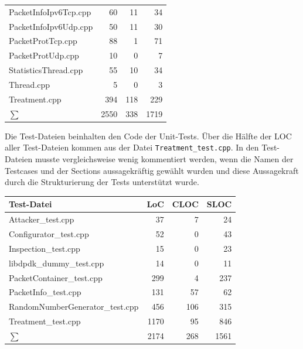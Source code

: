 \documentclass[../review_3.tex]{subfiles}
\begin{document}
\begin{longtable}[H]{p{10cm}rrr}
    PacketInfoIpv6Tcp.cpp    & 60           & 11            & 34            \\
    PacketInfoIpv6Udp.cpp    & 50           & 11            & 30            \\
    PacketProtTcp.cpp        & 88           & 1             & 71            \\
    PacketProtUdp.cpp        & 10           & 0             & 7             \\
    StatisticsThread.cpp     & 55           & 10            & 34            \\ %
    Thread.cpp               & 5            & 0             & 3             \\
    Treatment.cpp            & 394          & 118           & 229           \\ \midrule
    $\sum$                   & 2550         & 338           & 1719          \\ \bottomrule
\end{longtable}

Die Test-Dateien beinhalten den Code der Unit-Tests. Über die Hälfte der LOC aller Test-Dateien kommen aus der Datei \texttt{Treatment\_test.cpp}.
In den Test-Dateien musste vergleichsweise wenig kommentiert werden, wenn die Namen der Testcases und der Sections aussagekräftig gewählt wurden und diese Aussagekraft durch die Strukturierung der Tests unterstützt wurde.
\begin{longtable}[H]{p{10cm}rrr} \toprule
    \textbf{Test-Datei}             & \textbf{LoC} & \textbf{CLOC} & \textbf{SLOC} \\ \midrule \endhead
    Attacker\_test.cpp              & 37           & 7             & 24            \\
    Configurator\_test.cpp          & 52           & 0             & 43            \\
    Inspection\_test.cpp            & 15           & 0             & 23            \\
    libdpdk\_dummy\_test.cpp        & 14           & 0             & 11            \\
    PacketContainer\_test.cpp       & 299          & 4             & 237           \\
    PacketInfo\_test.cpp            & 131          & 57            & 62            \\ %
    RandomNumberGenerator\_test.cpp & 456          & 106           & 315           \\
    Treatment\_test.cpp             & 1170         & 95            & 846           \\  \midrule
    $\sum$                          & 2174         & 268           & 1561          \\ \bottomrule
\end{longtable}
\end{document}
